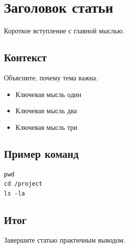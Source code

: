 \section{Заголовок статьи}

Короткое вступление с главной мыслью.

\subsection{Контекст}

Объясните, почему тема важна.

\begin{itemize}
\item Ключевая мысль один
\item Ключевая мысль два
\item Ключевая мысль три
\end{itemize}

\subsection{Пример команд}

\begin{verbatim}
pwd
cd /project
ls -la
\end{verbatim}

\subsection{Итог}

Завершите статью практичным выводом.
